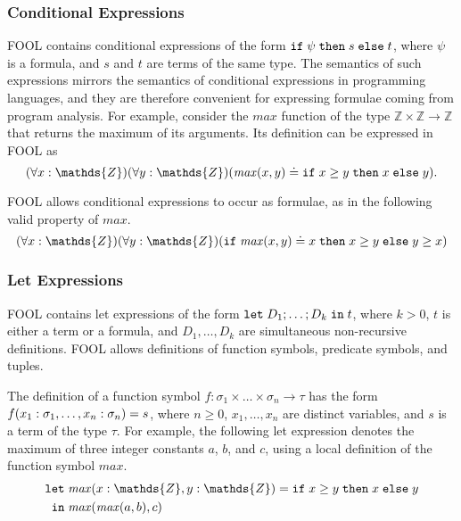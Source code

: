 \subsubsection{Conditional Expressions}
FOOL contains conditional expressions of the form $\mathtt{if}\;{\psi}\;\allowbreak\mathtt{then}\;{s}\;\allowbreak\mathtt{else}\;{t}$, where 
$\psi$ is a formula, and $s$ and $t$ are terms of the same type. 
The semantics of such expressions mirrors the semantics of conditional 
expressions in programming languages, and they are therefore convenient for 
expressing formulae coming from program analysis. 
For example, consider the $\mathit{max}$ function of the type 
$\mathds{Z}\times\mathds{Z}\to\mathds{Z}$ that returns the maximum of its 
arguments. 
Its definition can be expressed in FOOL as
\begin{equation}\label{eq:tfx/ite-t-example}
(\forall x:\mathds{Z})(\forall y:\mathds{Z})
(\mathit{max}(x, y) \eql \ite{x \geq y}{x}{y}).
\end{equation}

FOOL allows conditional expressions to occur as formulae, as in the
following valid property of $\mathit{max}$.
\begin{equation}\label{eq:tfx/ite-f-example}
(\forall x:\mathds{Z})(\forall y:\mathds{Z})
(\ite{\mathit{max}(x, y) \eql x}{x \geq y}{y \geq x})
\end{equation}

\subsubsection{Let Expressions}
FOOL contains let expressions of the form $\mathtt{let}\;{D_1;\ldots;D_k}\;\allowbreak\mathtt{in}\;{t}$, where
$k > 0$, $t$ is either a term or a formula, and $D_1,\ldots,D_k$ are
simultaneous non-recursive definitions. FOOL allows definitions of function
symbols, predicate symbols, and tuples.

The definition of a function symbol 
$f:\sigma_1\times\ldots\times\sigma_n\to\tau$ has the form 
${f(x_1:\sigma_1,\ldots,x_n:\sigma_n)}={s}$, where
$n \geq 0$, $x_1,\ldots,x_n$ are distinct variables, and $s$ is a term of the type $\tau$.
For example, the following let expression denotes the maximum of three 
integer constants $a$, $b$, and $c$, using a local definition of the function 
symbol $\mathit{max}$.
\begin{equation}\label{eq:tfx/fool-let-imply}
\begin{aligned}
\mathtt{let}\;&\binding{\mathit{max}(x:\mathds{Z},y:\mathds{Z})}
                       {\ite{x \geq y}{x}{y}}\\
 \mathtt{in}\;&\mathit{max}(\mathit{max}(a,b),c)
\end{aligned}
\end{equation}

